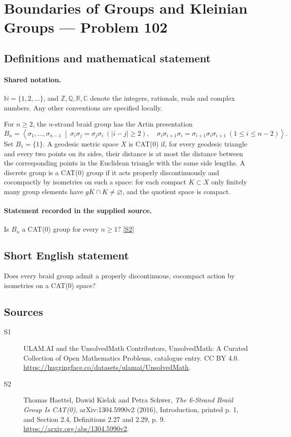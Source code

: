 \documentclass[11pt]{article}
\newcommand{\sref}[2]{\hyperlink{source:#1:#2}{[S#2]}}
\begin{document}
\section{Boundaries of Groups and Kleinian Groups — Problem 102}\label{statement}

\subsection{Definitions and mathematical statement}

\paragraph{Shared notation.}$\mathbb N=\{1,2,\ldots\}$, and $\mathbb Z,\mathbb Q,\mathbb R,\mathbb C$ denote the integers, rationals, reals and complex numbers. Any other conventions are specified locally.


For $n\ge2$, the $n$-strand braid group has the Artin presentation
\[B_n=\left\langle \sigma_1,\ldots,\sigma_{n-1}\ \middle|\ \sigma_i\sigma_j=\sigma_j\sigma_i\ (|i-j|\ge2),\quad \sigma_i\sigma_{i+1}\sigma_i=\sigma_{i+1}\sigma_i\sigma_{i+1}\ (1\le i\le n-2)\right\rangle.\]
Set $B_1=\{1\}$. A geodesic metric space $X$ is CAT(0) if, for every geodesic triangle and every two points on its sides, their distance is at most the distance between the corresponding points in the Euclidean triangle with the same side lengths. A discrete group is a CAT(0) group if it acts properly discontinuously and cocompactly by isometries on such a space: for each compact $K\subset X$ only finitely many group elements have $gK\cap K\ne\varnothing$, and the quotient space is compact.
\paragraph{Statement recorded in the supplied source.}
Is $B_n$ a CAT(0) group for every $n\ge1$? \sref{statement}{2}
\subsection{Short English statement}
Does every braid group admit a properly discontinuous, cocompact action by isometries on a CAT(0) space?
\subsection{Sources}
\begin{description}
\item[\hypertarget{source:statement:1}{S1}] ULAM.AI and the UnsolvedMath Contributors, UnsolvedMath: A Curated Collection of Open Mathematics Problems, catalogue entry. CC BY 4.0. \url{https://huggingface.co/datasets/ulamai/UnsolvedMath}.
\item[\hypertarget{source:statement:2}{S2}] Thomas Haettel, Dawid Kielak and Petra Schwer, \emph{The 6-Strand Braid Group Is CAT(0)}, arXiv:1304.5990v2 (2016), Introduction, printed p. 1, and Section 2.4, Definitions 2.27 and 2.29, p. 9. \url{https://arxiv.org/abs/1304.5990v2}.
\end{description}
\label{end:statement}
\end{document}
